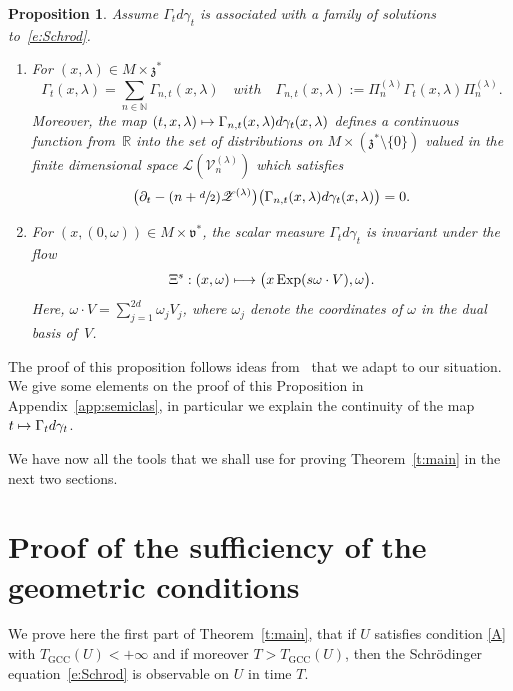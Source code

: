 \documentclass[JEP,XML,SOM,Unicode,published]{cedram}
\let\mathcal\mathscr
\newcommand\mto{\mathchoice{\longmapsto}{\mapsto}{\mapsto}{\mapsto}}
\newcommand{\GCC}{\mathrm{GCC}}
\DeclareMathOperator{\Exp}{Exp}
\theoremstyle{plain}
\newtheorem{proposition}[theorem]{Proposition}
\theoremstyle{definition}
\def\R{{\mathbb R}}
\def\N{{\mathbb N}}
\begin{document}
\begin{proposition} \label{p:measure0}
Assume $\Gamma_t d\gamma_t$ is associated with a family of solutions to~\eqref{e:Schrod}.
\begin{enumerate}
\item\label{p:measure01} For $(x,\lambda)\in M\times \mathfrak z^*$
\begin{equation}\label{eq:decomp}
\Gamma_t(x,\lambda)=\sum_{n\in\N } \Gamma_{n,t}(x,\lambda)\quad { with}\quad \Gamma_{n,t}(x,\lambda):= \Pi_n^{(\lambda)}\Gamma_t(x,\lambda) \Pi_n^{(\lambda)}.
\end{equation}
Moreover,
the map $(t,x,\lambda)\mto \Gamma_{n,t}(x,\lambda) d\gamma_t(x,\lambda)$ defines
a continuous function from~$\R$ into the set of distributions on $M\times (\mathfrak z^*\setminus\{0\})$ valued in the finite dimensional space ${\mathcal L}(\mathcal V_n^{(\lambda)})$ which
satisfies
\begin{equation}\label{transport}
\bigl(\partial_t -(n+\sfrac d 2) {\mathcal Z}^{(\lambda)}\bigr) \bigl(\Gamma_{n,t}(x,\lambda)d\gamma_t(x,\lambda) \bigr)=0.
\end{equation}
\item\label{p:measure02} For $(x,(0,\omega))\in M\times \mathfrak v^*$, the scalar measure $\Gamma_t d\gamma_t$ is invariant under the flow
\[
\Xi ^s:(x,\omega) \mto \bigl(x\Exp (s\omega\cdot V),\omega\bigr).
\]
Here, $\omega\cdot V=\sum_{j=1}^{2d} \omega_jV_j$, where $\omega_j$ denote the coordinates of $\omega$ in the dual basis of~$V$.
\end{enumerate}
\end{proposition}

The proof of this proposition follows ideas from~\cite{FF} that we adapt to our situation. We give some elements on the proof of this Proposition in Appendix~\ref{app:semiclas}, in particular we explain the continuity of the map $t\mto \Gamma_t d\gamma_t$.

We have now all the tools that we shall use for proving Theorem~\ref{t:main} in the next two sections.

\section{Proof of the sufficiency of the geometric conditions} \label{s:proofsufficiency}

We prove here the first part of Theorem~\ref{t:main}, that if $U$ satisfies condition \eqref{A} with $T_\GCC(U) <+\infty$ and if moreover $T>T_\GCC(U)$, then the Schrödinger equation~\eqref{e:Schrod} is observable on $U$ in time $T$.
\end{document}
